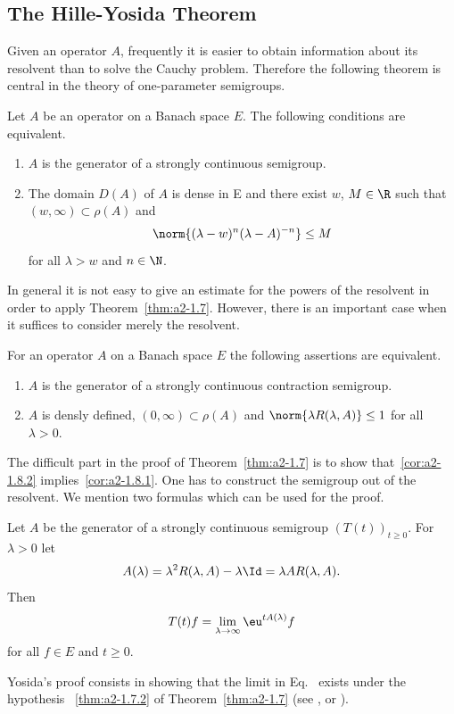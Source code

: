 \subsection{The Hille-Yosida Theorem} \label{subsec:a2-1.se3}%
Given an operator $A$, frequently it is easier to obtain information about its resolvent than to solve the Cauchy problem.
Therefore the following theorem is central in the theory of one-parameter semigroups.
\begin{theorem}\label{thm:a2-1.7}
Let $A$ be an operator on a Banach space $E$.
The following conditions are equivalent.
\begin{enumerate}[\upshape (a)]
\item \label{thm:a2-1.7.1}
$A$ is the generator of a strongly continuous semigroup.
\item \label{thm:a2-1.7.2}
The domain  $D(A)$ of\/ $A$ is dense in E and there exist $w$, $M \in \R$ such that $(w,\infty) \subset \rho(A)$ and
\[
    \norm{ {(\lambda - w)^{n}} (\lambda-A)^{-n}} \leq M 
\]
for all $\lambda > w$ and $n \in \N$.
\end{enumerate}
\end{theorem}
In general it is not easy to give an estimate for the powers of the resolvent in order to apply Theorem~\ref{thm:a2-1.7}. 
However, there is an important case when it suffices to consider merely the resolvent.
\begin{corollary}\label{cor:a2-1.8}
For an operator $A$ on a Banach space $E$ the following assertions are equivalent.
\begin{enumerate}[\upshape (a)]
\item \label{cor:a2-1.8.1}
$A$ is the generator of a strongly continuous contraction semigroup.
\item \label{cor:a2-1.8.2}
$A$ is densly defined, $(0,\infty) \subset \rho(A)$ and $\norm{\lambda R(\lambda,A)} \leq 1$ for all $\lambda > 0$.
\end{enumerate}
\end{corollary}
The difficult part in the proof of Theorem~\ref{thm:a2-1.7}   is to show that~\ref{cor:a2-1.8.2}   implies~\ref{cor:a2-1.8.1}. 
One has to construct the semigroup out of the resolvent.
We mention two formulas which can be used for the proof.
\begin{proposition}\label{prop:a2-1.9}
Let $A$ be the generator of a strongly continuous semigroup
$(T(t))_{t \geq 0}$.
For $\lambda > 0$ let 
\[
A(\lambda) = \lambda^{2} R(\lambda,A)-\lambda \Id  =\lambda A R(\lambda,A).
\]
Then
\begin{equation}\label{eq:a2-1.2}
    T(t)f = \lim_{\lambda \to \infty} \eu^{tA(\lambda)}f
\end{equation}
for all $f \in E$ and $t \geq 0$.
\end{proposition}
Yosida's proof consists in showing that the limit in Eq.~ exists under the hypothesis ~\ref{thm:a2-1.7.2} of Theorem~\ref{thm:a2-1.7}  
(see \textcite{davies:1980}, \textcite{goldstein:1985b} or \textcite{pazy:1983}).

